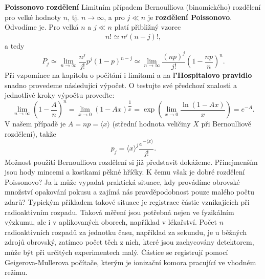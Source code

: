 \wikitextrule
\begin{example}\label{mai:exam068}
  \textbf{Poissonovo rozdělení}\newline\small
  Limitním případem Bernoulliova (binomického) rozdělení pro velké hodnoty \(n\), tj. \(n 
  \rightarrow \infty\), a pro \(j \ll n\) je \textbf{rozdělení Poissonovo}. Odvodíme je. Pro velká 
  \(n\) a \(j \ll n\) platí přibližný vzorec
  \begin{equation*}
    n! \simeq n^j(n-j)!,
  \end{equation*}
  a tedy
  \begin{equation*}
    P_j \simeq \lim\limits_{n\rightarrow\infty}\dfrac{n^j}{j!}p^j(1-p)^{n - j}
        \simeq \lim\limits_{n\rightarrow\infty}\dfrac{(np)^j}{j!}\left(1-\dfrac{np}{n}\right)^{n}.
  \end{equation*}
  Při vzpomínce na kapitolu o počítání i limitami a na \textbf{l’Hospitalovo pravidlo} snadno 
  provedeme následující výpočet. O testujte své předchozí znalosti a jednotlivé kroky výpočtu 
  proveďte:
  \begin{equation*}
    \lim\limits_{n\rightarrow\infty}\left(1 - \dfrac{A}{n}\right)^n = 
    \lim\limits_{x\rightarrow0}\left(1 - Ax\right)^\dfrac{1}{x} =
    \exp\left(\lim\limits_{x\rightarrow0}\dfrac{\ln(1 - Ax)}{x}\right) = e^{-A}.
  \end{equation*}
  V našem případě je \(A = np = \langle x \rangle\) (střední hodnota veličiny \(X\) při 
  Bernoulliově rozdělení), takže
  \begin{equation}\label{mai:eq065}
    p_j = \langle x \rangle^j\dfrac{e^{-\langle x \rangle}}{j!}.
  \end{equation}
  Možnost použití Bernoulliova rozdělení si již představit dokážeme. Přinejmenším jsou hody mincemi 
  a kostkami pěkné hříčky. K čemu však je dobré rozdělení Poissonovo? Ja k může vypadat praktická 
  situace, kdy provádíme obrovské množství opakování pokusu a zajímá nás pravděpodobnost pouze 
  malého počtu zdarů? Typickým příkladem takové situace je registrace částic vznikajících při 
  radioaktivním rozpadu. Taková měření jsou potřebná nejen ve fyzikálním výzkumu, ale i v 
  aplikovaných oborech, například v lékařství. Počet \(n\) radioaktivních rozpadů za jednotku času, 
  například za sekundu, je u běžných zdrojů obrovský, zatímco počet těch z nich, které jsou 
  zachycovány detektorem, může být při určitých experimentech malý. Částice se registrují
  pomocí Geigerova-Mullerova počítače, kterým je ionizační komora pracující ve vhodném režimu. 

\end{example}

